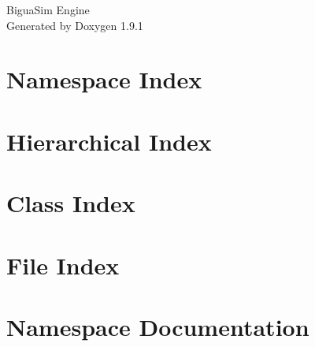 \let\mypdfximage\pdfximage\def\pdfximage{\immediate\mypdfximage}\documentclass[twoside]{book}
\newcommand{\+}{\discretionary{\mbox{\scriptsize$\hookleftarrow$}}{}{}}
\newcommand{\clearemptydoublepage}{%
  \newpage{\pagestyle{empty}\cleardoublepage}%
}
\begin{document}
\raggedbottom

\hypersetup{pageanchor=false,
             bookmarksnumbered=true,
             pdfencoding=unicode
            }
\begin{titlepage}
\vspace*{7cm}
\begin{center}%
{\Large Bigua\+Sim Engine }\\
\vspace*{1cm}
{\large Generated by Doxygen 1.9.1}\\
\end{center}
\end{titlepage}
\clearemptydoublepage
{}
\tableofcontents
\clearemptydoublepage
{}
\hypersetup{pageanchor=true}

\chapter{Namespace Index}

\chapter{Hierarchical Index}

\chapter{Class Index}

\chapter{File Index}

\chapter{Namespace Documentation}



\end{document}

